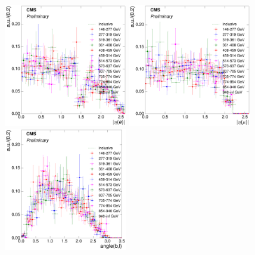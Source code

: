 \begin{figure}[hbtp]
    \centering
     \includegraphics[width=0.48\textwidth]{Chapters/04_Analysis/04b_XSections/images/8TeV/fit_variables/electron/ST/electron_absolute_eta/vjets/ST_electron_absolute_eta_2orMoreBtags_VJets_template_comparison.pdf}\hfill
     \includegraphics[width=0.48\textwidth]{Chapters/04_Analysis/04b_XSections/images/8TeV/fit_variables/muon/ST/muon_absolute_eta/vjets/ST_muon_absolute_eta_2orMoreBtags_VJets_template_comparison.pdf}\\
     \includegraphics[width=0.48\textwidth]{Chapters/04_Analysis/04b_XSections/images/8TeV/fit_variables/electron/ST/angle_bl/vjets/ST_angle_bl_2orMoreBtags_VJets_template_comparison.pdf}\hfill

\end{figure}
